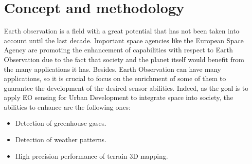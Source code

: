 \section{Concept and methodology}










Earth observation is a field with a great potential that has not been taken into account until the last decade. Important space agencies like the European Space Agency are promoting the enhancement of capabilities with respect to Earth Observation due to the fact that society and the planet itself would benefit from the many applications it has. Besides, Earth Observation can have many applications, so it is crucial to focus on the enrichment of some of them to guarantee the development of the desired sensor abilities. Indeed, as the goal is to apply EO sensing for Urban Development to integrate space into society, the abilities to enhance are the following ones:

\begin{itemize}
 \item  Detection of greenhouse gases.
 \item  Detection of weather patterns.
 \item  High precision performance of terrain 3D mapping.
\end{itemize}


